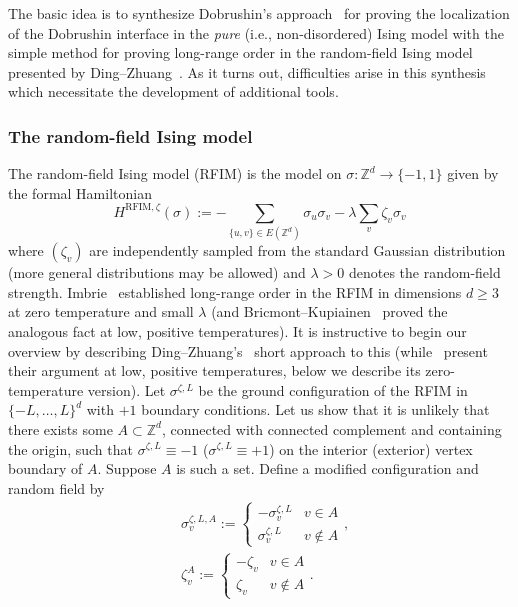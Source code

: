 \documentclass[11pt, reqno]{amsart}
\newcommand{\Z}{\mathbb{Z}}
\numberwithin{equation}{section}
\begin{document}
The basic idea is to synthesize Dobrushin's approach~\cite{Dob} for proving the localization of the Dobrushin interface in the \emph{pure} (i.e., non-disordered) Ising model with the simple method for proving long-range order in the random-field Ising model presented by Ding--Zhuang~\cite{DZ}.  
As it turns out, difficulties arise in this synthesis which necessitate the development of additional tools.

\subsubsection{The random-field Ising model} The random-field Ising model (RFIM) is the model on $\sigma:\Z^d\to\{-1,1\}$ given by the formal Hamiltonian
\begin{equation}\label{eq:RFIM Hamiltonian}
H^{\text{RFIM}, \zeta}(\sigma):=-\sum_{\{u,v\}\in E(\Z^d)}\sigma_u \sigma_v - \lambda\sum_v \zeta_v\sigma_v
\end{equation}
where $(\zeta_v)$ are independently sampled from the standard Gaussian distribution (more general distributions may be allowed) and $\lambda>0$ denotes the random-field strength. Imbrie~\cites{I84,I85} established long-range order in the RFIM in dimensions $d\ge 3$ at zero temperature and small $\lambda$ (and Bricmont--Kupiainen~\cites{BK87, BK88} proved the analogous fact at low, positive temperatures). It is instructive to begin our overview by describing Ding--Zhuang's~\cite{DZ} short approach to this (while~\cite{DZ} present their argument at low, positive temperatures, below we describe its zero-temperature version). Let $\sigma^{\zeta,L}$ be the ground configuration of the RFIM in $\{-L,\ldots, L\}^d$ with $+1$ boundary conditions. Let us show that it is unlikely that there exists some $A\subset\Z^d$, connected with connected complement and containing the origin, such that $\sigma^{\zeta,L}\equiv -1$ ($\sigma^{\zeta,L}\equiv +1$) on the interior (exterior) vertex boundary of $A$. Suppose $A$ is such a set. Define a modified configuration and random field by
\begin{equation}\label{eq:RFIM discrete symmetry}
\begin{split}
&\sigma^{\zeta,L,A}_v:=\begin{cases}
-\sigma^{\zeta,L}_v&v\in A\\
\sigma^{\zeta,L}_v&v\notin A
\end{cases},\\
&\zeta^A_v:=\begin{cases}-\zeta_v&v\in A\\
\zeta_v&v\notin A
\end{cases}.
\end{split}
\end{equation}
\end{document}
